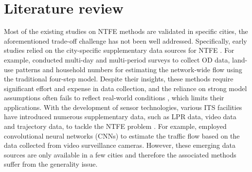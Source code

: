 \section{Literature review}
\label{sec:liter}
Most of the existing studies on NTFE methods are validated in specific cities, the aforementioned trade-off challenge has not been well addressed. Specifically, early studies relied on the city-specific supplementary data sources for NTFE \citep{daganzo1997fundamentals, pendyala2000multi, lam2001activity, vuchic2007urban}. For example, \cite{pendyala2000multi} conducted multi-day and multi-period surveys to collect OD data, land-use patterns and household numbers for estimating the network-wide flow using the traditional four-step model. Despite their insights, these methods require significant effort and expense in data collection, and the reliance on strong model assumptions often fails to reflect real-world conditions \citep{google_flow,transfer_flow_3}, which limits their applications. With the development of sensor technologies, various ITS facilities have introduced numerous supplementary data, such as LPR data, video data and trajectory data, to tackle the NTFE problem \citep{cellphone_flow, machine_flow_1, camera_flow}. For example, \citet{camera_flow} employed convolutional neural networks (CNNs) to estimate the traffic flow based on the data collected from video surveillance cameras. However, these emerging data sources are only available in a few cities and therefore the associated methods suffer from the generality issue.


